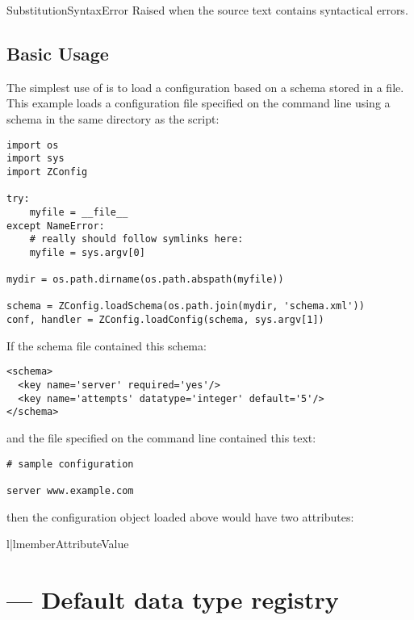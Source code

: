 \documentclass{howto}
\begin{document}
\begin{excdesc}{SubstitutionSyntaxError}
  Raised when the source text contains syntactical errors.
\end{excdesc}


\subsection{Basic Usage}

The simplest use of  is to load a configuration
based on a schema stored in a file.  This example loads a
configuration file specified on the command line using a schema in the
same directory as the script:

\begin{verbatim}
import os
import sys
import ZConfig

try:
    myfile = __file__
except NameError:
    # really should follow symlinks here:
    myfile = sys.argv[0]

mydir = os.path.dirname(os.path.abspath(myfile))

schema = ZConfig.loadSchema(os.path.join(mydir, 'schema.xml'))
conf, handler = ZConfig.loadConfig(schema, sys.argv[1])
\end{verbatim}

If the schema file contained this schema:

\begin{verbatim}
<schema>
  <key name='server' required='yes'/>
  <key name='attempts' datatype='integer' default='5'/>
</schema>
\end{verbatim}

and the file specified on the command line contained this text:

\begin{verbatim}
# sample configuration

server www.example.com
\end{verbatim}

then the configuration object  loaded above would have two
attributes:

\begin{tableii}{l|l}{member}{Attribute}{Value}
\end{tableii}


\section{ --- Default data type registry}
\end{document}
